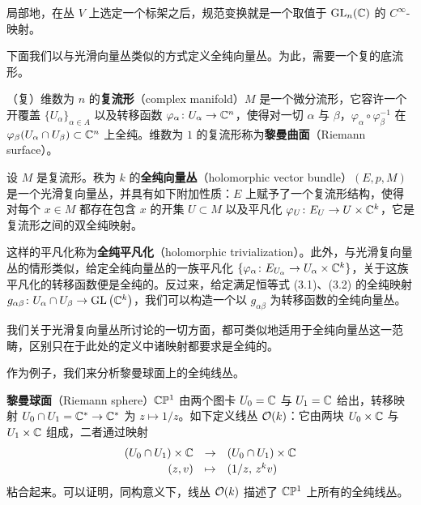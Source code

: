 \begin{remark}[3.10]
局部地，在丛 $V$ 上选定一个标架之后，规范变换就是一个取值于 $\operatorname{GL}_n(\mathbb{C})$ 的 $C^\infty$-映射。
\end{remark}

下面我们以与光滑向量丛类似的方式定义全纯向量丛。为此，需要一个复的底流形。

\begin{definition}[3.11]
（复）维数为 $n$ 的\textbf{复流形}（complex manifold）$M$ 是一个微分流形，它容许一个开覆盖 $\{U_\alpha\}_{\alpha\in A}$ 以及转移函数 $\varphi_\alpha\colon U_\alpha\to\mathbb{C}^n$，使得对一切 $\alpha$ 与 $\beta$，$\varphi_\alpha\circ\varphi_\beta^{-1}$ 在 $\varphi_\beta(U_\alpha\cap U_\beta)\subset\mathbb{C}^n$ 上全纯。维数为 $1$ 的复流形称为\textbf{黎曼曲面}（Riemann surface）。
\end{definition}

\begin{definition}[3.12]
设 $M$ 是复流形。秩为 $k$ 的\textbf{全纯向量丛}（holomorphic vector bundle）$(E,p,M)$ 是一个光滑复向量丛，并具有如下附加性质：$E$ 上赋予了一个复流形结构，使得对每个 $x\in M$ 都存在包含 $x$ 的开集 $U\subset M$ 以及平凡化 $\varphi_U\colon E_U\to U\times\mathbb{C}^k$，它是复流形之间的双全纯映射。
\end{definition}

这样的平凡化称为\textbf{全纯平凡化}（holomorphic trivialization）。此外，与光滑复向量丛的情形类似，给定全纯向量丛的一族平凡化 $\{\varphi_\alpha\colon E_{U_\alpha}\to U_\alpha\times\mathbb{C}^k\}$，关于这族平凡化的转移函数便是全纯的。反过来，给定满足恒等式 (3.1)、(3.2) 的全纯映射 $g_{\alpha\beta}\colon U_\alpha\cap U_\beta\to\operatorname{GL}\big(\mathbb{C}^k\big)$，我们可以构造一个以 $g_{\alpha\beta}$ 为转移函数的全纯向量丛。

我们关于光滑复向量丛所讨论的一切方面，都可类似地适用于全纯向量丛这一范畴，区别只在于此处的定义中诸映射都要求是全纯的。

作为例子，我们来分析黎曼球面上的全纯线丛。

\begin{example}[3.13]
\textbf{黎曼球面}（Riemann sphere）$\mathbb{C}\mathbb{P}^1$ 由两个图卡 $U_0=\mathbb{C}$ 与 $U_1=\mathbb{C}$ 给出，转移映射 $U_0\cap U_1=\mathbb{C}^\ast\to\mathbb{C}^\ast$ 为 $z\mapsto 1/z$。如下定义线丛 $\mathcal{O}(k)$：它由两块 $U_0\times\mathbb{C}$ 与 $U_1\times\mathbb{C}$ 组成，二者通过映射
\[
\begin{array}{rcl}
(U_0\cap U_1)\times\mathbb{C} & \to & (U_0\cap U_1)\times\mathbb{C}\\[2pt]
(z,v) & \mapsto & (1/z,\,z^{k}v)
\end{array}
\]
粘合起来。可以证明，同构意义下，线丛 $\mathcal{O}(k)$ 描述了 $\mathbb{C}\mathbb{P}^1$ 上所有的全纯线丛。
\end{example}

